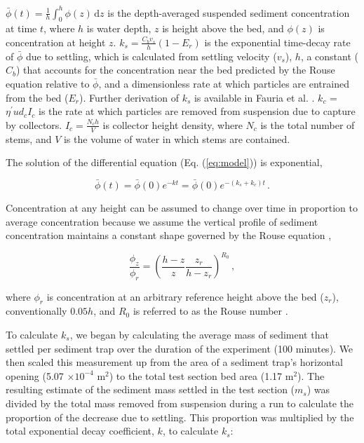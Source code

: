 \documentclass[geosciences,article,submit,moreauthors,pdftex]{Definitions/mdpi}
\begin{document}
\noindent $\bar{\phi}(t) = \frac{1}{h} \int_0^h\phi(z) \,\mathrm{d}z$ is the depth-averaged suspended sediment concentration at time $t$, where $h$ is water depth, $z$ is height above the bed, and $\phi(z)$ is concentration at height $z$. $k_s = \frac{C_bv_s}{h}(1-E_r)$ is the exponential time-decay rate of $\bar{\phi}$ due to settling, which is calculated from settling velocity ($v_s$), $h$, a constant ($C_b$) that accounts for the concentration near the bed predicted by the Rouse equation relative to $\bar{\phi}$, and a dimensionless rate at which particles are entrained from the bed ($E_r$). Further derivation of $k_s$ is available in Fauria et al. \cite{Fauria_2015}. $k_c$ = $\eta^{\prime}ud_cI_c$ is the rate at which particles are removed from suspension due to capture by collectors. $I_c = \frac{N_ch}{V}$ is collector height density, where $N_c$ is the total number of stems, and $V$ is the volume of water in which stems are contained.

The solution of the differential equation (Eq. (\ref{eq:model})) is exponential,

\begin{equation}
    \bar{\phi}(t) = \bar{\phi}(0)e^{-kt} = \bar{\phi}(0)e^{-(k_s + k_c)t}\,.
    \label{eq:expo}    
\end{equation}

\noindent Concentration at any height can be assumed to change over time in proportion to average concentration because we assume the vertical profile of sediment concentration maintains a constant shape governed by the Rouse equation \cite{rouse1937modern},

\begin{equation}
    \frac{\phi_z}{\phi_r} = \left( \frac{h - z}{z} \frac{z_r}{h - z_r} \right)^{R_0}\,,
    \label{eq:rouse}    
\end{equation}

\noindent where $\phi_r$ is concentration at an arbitrary reference height above the bed ($z_r$), conventionally $0.05h$, and $R_0$ is referred to as the Rouse number \cite{kumbhakar2017derivation}.

To calculate $k_s$, we began by calculating the average mass of sediment that settled per sediment trap over the duration of the experiment (100 minutes). We then scaled this measurement up from the area of a sediment trap's horizontal opening (5.07 $\times 10^{-4}$ m$^2$) to the total test section bed area (1.17 m$^2$). The resulting estimate of the sediment mass settled in the test section ($m_s$) was divided by the total mass removed from suspension during a run to calculate the proportion of the decrease due to settling. This proportion was multiplied by the total exponential decay coefficient, $k$, to calculate $k_s$:
\end{document}
